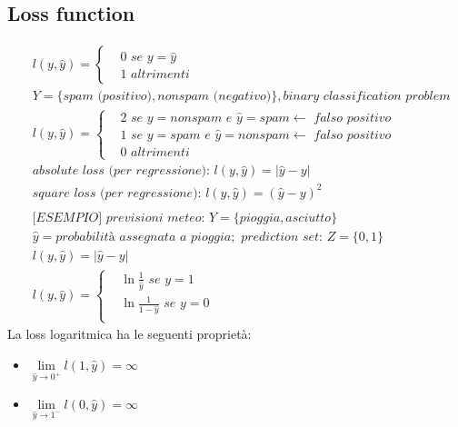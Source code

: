 \documentclass{article}
\begin{document}
\subsection{Loss function}
\begin{displaymath}
	\begin{split}
		&l(y, \hat{y})=\begin{cases}
			&0 \textit{ se } y= \hat{y}\\
			&1 \textit{ altrimenti}
		\end{cases}\\
		&Y=\{ \textit{spam (positivo)}, \textit{nonspam (negativo)} \}, \textit{binary classification problem} \\
		&l(y, \hat{y})=\begin{cases}
			&2 \textit{ se } y= \textit{nonspam e }\hat{y} = \textit{spam} \leftarrow \textit{ falso positivo} \\
			&1 \textit{ se } y= \textit{spam e }\hat{y} = \textit{nonspam} \leftarrow \textit{ falso positivo} \\
			&0 \textit{ altrimenti}						
		\end{cases} \\
		&\textit{absolute loss (per regressione): } l(y, \hat{y})= |\hat{y}-y| \\ 
		&\textit{square loss (per regressione): } l(y, \hat{y})= (\hat{y}-y)^2 \\
		& \\
		&\textit{[ESEMPIO] previsioni meteo: }Y=\{ \textit{pioggia}, \textit{asciutto} \}\\ 
		&\hat{y}=\textit{probabilità assegnata a pioggia}; \textit{ prediction set: } Z=\{0,1\} \\
		&l(y, \hat{y})=|\hat{y}-y| \\
		&l(y, \hat{y}) = \begin{cases}
				&\ln \frac{1}{\hat{y}} \textit{ se } y=1 \\
				&\ln \frac{1}{1-\hat{y}} \textit{ se } y=0 \\
			\end{cases}
	\end{split}
\end{displaymath}
La loss logaritmica ha le seguenti proprietà:
\begin{itemize}
	\item $\lim\limits_{\hat{y}\rightarrow 0^+}l(1,\hat{y})=\infty$
	\item $\lim\limits_{\hat{y}\rightarrow 1^-}l(0,\hat{y})=\infty$
\end{itemize} 
\end{document}
